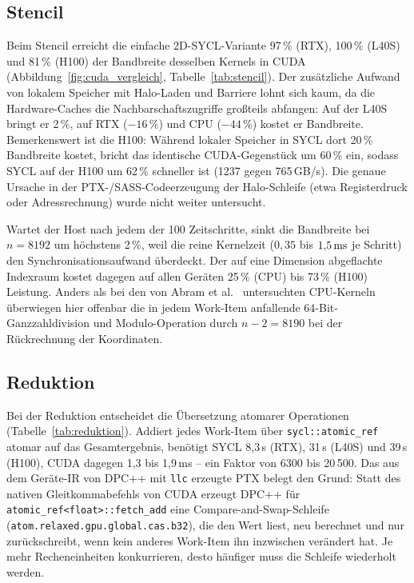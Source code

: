 \documentclass[12pt,a4paper]{article}
\begin{document}
\subsection{Stencil}\label{sec:e-stencil}

Beim Stencil erreicht die einfache 2D-SYCL-Variante 97\,\% (RTX), 100\,\%
(L40S) und 81\,\% (H100) der Bandbreite desselben Kernels in CUDA
(Abbildung~\ref{fig:cuda_vergleich}, Tabelle~\ref{tab:stencil}). Der
zusätzliche Aufwand von lokalem Speicher mit Halo-Laden und Barriere lohnt sich
kaum, da die Hardware-Caches die Nachbarschaftszugriffe großteils abfangen:
Auf der L40S bringt er 2\,\%, auf RTX ($-16\,\%$) und CPU ($-44\,\%$) kostet er
Bandbreite. Bemerkenswert ist die H100: Während lokaler Speicher in SYCL dort
20\,\% Bandbreite kostet, bricht das identische CUDA-Gegenstück um 60\,\% ein,
sodass SYCL auf der H100 um 62\,\% schneller ist (1237 gegen 765\,GB/s). Die
genaue Ursache in der PTX-/SASS-Codeerzeugung der Halo-Schleife (etwa
Registerdruck oder Adressrechnung) wurde nicht weiter untersucht.

Wartet der Host nach jedem der 100 Zeitschritte, sinkt die Bandbreite bei
$n = 8192$ um höchstens 2\,\%, weil die reine Kernelzeit ($0{,}35$ bis
$1{,}5\text{\,ms}$ je Schritt) den Synchronisationsaufwand überdeckt. Der auf
eine Dimension abgeflachte Indexraum kostet dagegen auf allen Geräten 25\,\%
(CPU) bis 73\,\% (H100) Leistung. Anders als bei den von Abram et al.\
\cite{abram2025sycl} untersuchten CPU-Kerneln überwiegen hier offenbar die in
jedem Work-Item anfallende 64-Bit-Ganzzahldivision und Modulo-Operation durch
$n - 2 = 8190$ bei der Rückrechnung der Koordinaten.

\subsection{Reduktion}\label{sec:e-reduktion}

Bei der Reduktion entscheidet die Übersetzung atomarer Operationen
(Tabelle~\ref{tab:reduktion}). Addiert jedes Work-Item über
\texttt{sycl::atomic\_ref} atomar auf das Gesamtergebnis, benötigt SYCL 8,3\,s
(RTX), 31\,s (L40S) und 39\,s (H100), CUDA dagegen 1,3 bis 1,9\,ms -- ein
Faktor von 6300 bis 20\,500. Das aus dem Geräte-IR von DPC++ mit \texttt{llc}
erzeugte PTX belegt den Grund: Statt des nativen Gleitkommabefehls von CUDA
erzeugt DPC++ für \texttt{atomic\_ref<float>::fetch\_add} eine
Compare-and-Swap-Schleife (\texttt{atom.relaxed.gpu.global.cas.b32}), die den
Wert liest, neu berechnet und nur zurückschreibt, wenn kein anderes Work-Item
ihn inzwischen verändert hat. Je mehr Recheneinheiten konkurrieren, desto
häufiger muss die Schleife wiederholt werden.
\end{document}
